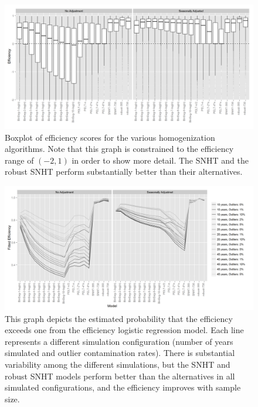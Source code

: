 \documentclass[12pt]{article}
\begin{document}
\begin{figure}[h!]
	\centering
	\includegraphics[width=\textwidth]{Efficiency_Model_Plot_BW_seas_adj.png}
	\caption{Boxplot of efficiency scores for the various homogenization algorithms.  Note that this graph is constrained to the efficiency range of $(-2,1)$ in order to show more detail.  The SNHT and the robust SNHT perform substantially  better than their alternatives.}
	\label{fig:homEfficiency}
\end{figure}

\begin{figure}[h!]
	\centering
	\includegraphics[width=\textwidth]{Efficiency_Model_Plot_BW_seasonal.png}
	\caption{This graph depicts the estimated probability that the efficiency exceeds one from the efficiency logistic regression model.  Each line represents a different simulation configuration (number of years simulated and outlier contamination rates).  There is substantial variability among the different simulations, but  the SNHT and robust SNHT models perform better than the alternatives in all simulated configurations, and the efficiency improves with sample size.}
	\label{fig:homFitEff}
\end{figure}
\end{document}

